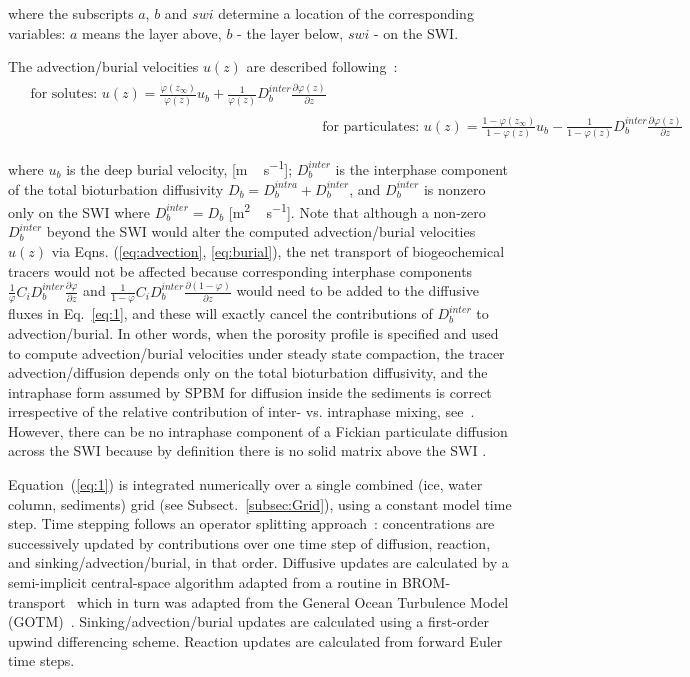 \documentclass[gmd, manuscript]{copernicus}
\begin{document}
where the subscripts $a$, $b$ and $swi$ determine a location of the corresponding variables: $a$ means the layer above, $b$ - the layer below, $swi$ - on the \textrm{SWI}.

The advection/burial velocities $u(z)$ are described following~\citet{Yakushev2017}:
\begin{align}
\begin{split}
\label{eq:advection}
    & \text{for solutes: } u(z) =
    \frac{\varphi(z_{\infty})}{\varphi(z)} u_{b} +
    \frac{1}{\varphi(z)} D_{b}^{inter}
    \frac{\partial \varphi(z)}{\partial z}
\end{split} \\
     & \text{for particulates: } u(z) =
    \frac{1 - \varphi(z_{\infty})}{1 - \varphi(z)} u_{b} -
    \frac{1}{1 - \varphi(z)} D_{b}^{inter}
    \frac{\partial \varphi(z)}{\partial z}
\label{eq:burial}
\end{align}

where $u_{b}$ is the deep burial velocity, [\unit{m\,s^{-1}}];
$D_{b}^{inter}$ is the interphase component of the total bioturbation diffusivity $D_{b} = D_{b}^{intra} + D_{b}^{inter}$, and $D_{b}^{inter}$ is nonzero only on the \textrm{SWI} where $D_{b}^{inter} = D_{b}$ [\unit{m^{2}\,s^{-1}}].
Note that although a non-zero $D_{b}^{inter}$ beyond the \textrm{SWI} would alter the computed advection/burial velocities $u(z)$ via Eqns. (\ref{eq:advection}, \ref{eq:burial}), the net transport of biogeochemical tracers would not be affected because corresponding interphase components $\frac{1}{\varphi} C_{i} D_{b}^{inter} \frac{\partial \varphi}{\partial z}$ and $\frac{1}{1 - \varphi} C_{i} D_{b}^{inter} \frac{\partial(1 - \varphi)}{\partial z}$ would need to be added to the diffusive fluxes in Eq.~\ref{eq:1}, and these will exactly cancel the contributions of $D_{b}^{inter}$ to advection/burial.
In other words, when the porosity profile is specified and used to compute advection/burial velocities under steady state compaction, the tracer advection/diffusion depends only on the total bioturbation diffusivity, and the intraphase form assumed by \textrm{SPBM} for diffusion inside the sediments is correct irrespective of the relative contribution of inter- vs. intraphase mixing, see~\citep{Meysman2005}.
However, there can be no intraphase component of a Fickian particulate diffusion across the \textrm{SWI} because by definition there is no solid matrix above the \textrm{SWI} \citep{Yakushev2017}.

Equation~(\ref{eq:1}) is integrated numerically over a single combined (ice, water column, sediments) grid (see Subsect.~\ref{subsec:Grid}), using a constant model time step.
Time stepping follows an operator splitting approach~\citep{Butenschon2012}: concentrations are successively updated by contributions over one time step of diffusion, reaction, and sinking/advection/burial, in that order.
Diffusive updates are calculated by a semi-implicit central-space algorithm adapted from a routine in \textrm{BROM}-transport~\citep{Yakushev2017} which in turn was adapted from the General Ocean Turbulence Model (\textrm{GOTM})~\citep{Umlauf2005}.
Sinking/advection/burial updates are calculated using a first-order upwind differencing scheme.
Reaction updates are calculated from forward Euler time steps.
\end{document}

